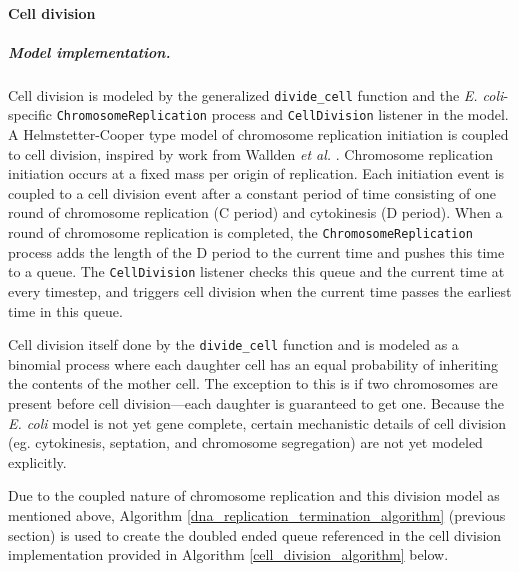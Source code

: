\documentclass[12pt]{article}
\begin{document}
\baselineskip24pt

\paragraph{Cell division}

\subparagraph{Model implementation.}
Cell division is modeled by the generalized \texttt{divide\_cell} function and the \emph{E. coli}-specific \texttt{ChromosomeReplication} process and \texttt{CellDivision} listener in the model. A Helmstetter-Cooper type model of chromosome replication initiation is coupled to cell division, inspired by work from Wallden \emph{et al.}  \cite{Wallden2016}. Chromosome replication initiation occurs at a fixed mass per origin of replication. Each initiation event is coupled to a cell division event after a constant period of time consisting of one round of chromosome replication (C period) and cytokinesis (D period). When a round of chromosome replication is completed, the \texttt{ChromosomeReplication} process adds the length of the D period to the current time and pushes this time to a queue. The \texttt{CellDivision} listener checks this queue and the current time at every timestep, and triggers cell division when the current time passes the earliest time in this queue.

Cell division itself done by the \texttt{divide\_cell} function and is modeled as a binomial process where each daughter cell has an equal probability of inheriting the contents of the mother cell. The exception to this is if two chromosomes are present before cell division---each daughter is guaranteed to get one. Because the \textit{E. coli} model is not yet gene complete, certain mechanistic details of cell division (eg. cytokinesis, septation, and chromosome segregation) are not yet modeled explicitly.

Due to the coupled nature of chromosome replication and this division model as mentioned above, Algorithm \ref{dna_replication_termination_algorithm} (previous section) is used to create the doubled ended queue referenced in the cell division implementation provided in Algorithm \ref{cell_division_algorithm} below.\\
\end{document}
